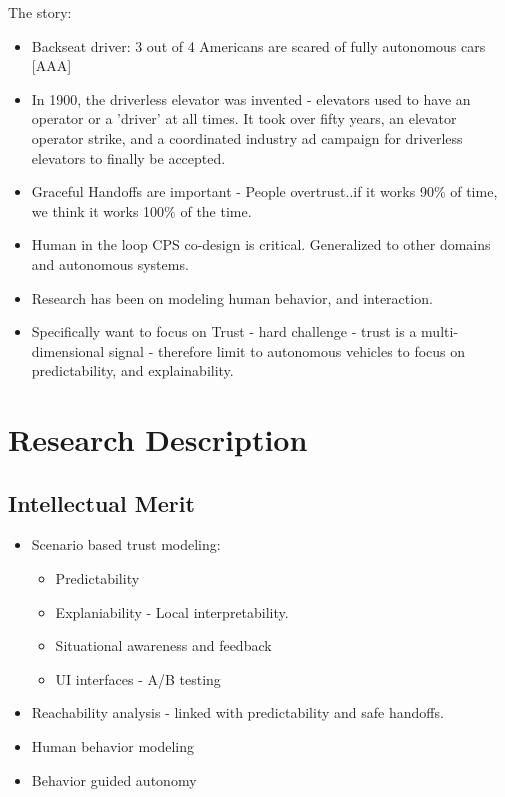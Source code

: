 
The story:
\begin{itemize}
    \item Backseat driver: 3 out of 4 Americans are scared of fully autonomous cars [AAA]
    \item In 1900, the driverless elevator was invented - elevators used to have an operator or a 'driver' at all times. It took over fifty years, an elevator operator strike, and a coordinated industry ad campaign for driverless elevators to finally be accepted.
    \item Graceful Handoffs are important - People overtrust..if it works 90\% of time, we think it works 100\% of the time. 
    \item Human in the loop CPS co-design is critical. Generalized to other domains and autonomous systems.
    \item Research has been on modeling human behavior, and interaction.
    \item Specifically want to focus on Trust - hard challenge - trust is a multi-dimensional signal - therefore limit to autonomous vehicles to focus on predictability, and explainability. 
\end{itemize}

\section{Research Description}
%



\subsection{Intellectual Merit}

\begin{itemize}
 \item  Scenario based trust modeling:
    \begin{itemize}
        \item Predictability
        \item Explaniability - Local interpretability. 
        \item Situational awareness and feedback
        \item UI interfaces - A/B testing
    \end{itemize} 
  \item Reachability analysis - linked with predictability and safe handoffs.
  \item Human behavior modeling
  \item Behavior guided autonomy
\end{itemize}

